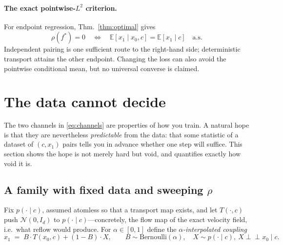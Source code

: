 \documentclass{article}
\theoremstyle{plain}
\newcommand{\Eop}{\mathbb{E}}
\newcommand{\Ncal}{\mathcal{N}}
\newcommand{\indep}{\perp\!\!\!\perp}
\begin{document}
\paragraph{The exact pointwise-$L^2$ criterion.} For endpoint regression,
Thm.~\ref{thm:optimal} gives
\begin{equation}
  \rho(f^\ast)=0\quad\Longleftrightarrow\quad
  \Eop[x_1\mid x_0,c]=\Eop[x_1\mid c]\quad\text{a.s.}
  \label{eq:channels}
\end{equation}
Independent pairing is one sufficient route to the right-hand side; deterministic
transport attains the other endpoint. Changing the loss can also avoid the pointwise
conditional mean, but no universal converse is claimed.

\section{The data cannot decide}
\label{sec:imposs}

The two channels in \eqref{eq:channels} are properties of how you train. A natural
hope is that they are nevertheless \emph{predictable} from the data: that some
statistic of a dataset of $(c,x_1)$ pairs tells you in advance whether one step will
suffice. This section shows the hope is not merely hard but void, and quantifies
exactly how void it is.

\subsection{A family with fixed data and sweeping \texorpdfstring{$\rho$}{rho}}
\label{sec:alphafam}

Fix $p(\cdot\mid c)$, assumed atomless so that a transport map exists, and let
$T(\cdot,c)$ push $\Ncal(0,I_d)$ to $p(\cdot\mid c)$---concretely, the flow map of the
exact velocity field, i.e.\ what reflow would produce. For $\alpha\in[0,1]$ define the
\emph{$\alpha$-interpolated coupling}
\begin{equation}
  x_1 \;=\; B\cdot T(x_0,c) + (1-B)\cdot X,\qquad
  B\sim\mathrm{Bernoulli}(\alpha),\quad X\sim p(\cdot\mid c),\ X\indep x_0\mid c .
  \label{eq:alpha}
\end{equation}
\end{document}
